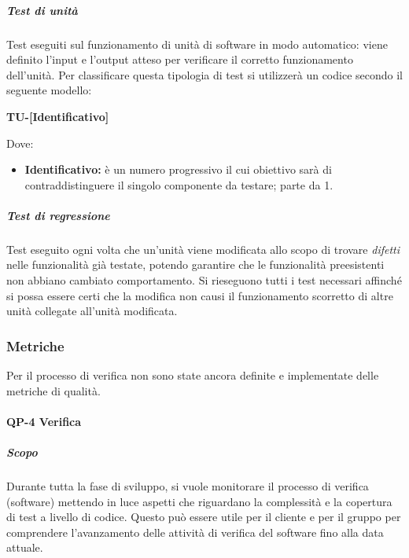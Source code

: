                     \subparagraph*{Test di unità}
                            Test eseguiti sul funzionamento di unità di software in modo automatico: viene definito l'input e l'output atteso per verificare il corretto funzionamento dell'unità.
                            Per classificare questa tipologia di test si utilizzerà un codice secondo il seguente modello:     

                            \begin{center}
                            	\textbf{TU-[Identificativo]}
                            \end{center}
                            Dove:
                            
							\begin{itemize}
                            	\item \textbf{Identificativo:} è un numero progressivo il cui obiettivo sarà di contraddistinguere il singolo componente da testare; parte da 1.
							\end{itemize}
						
                    \subparagraph*{Test di regressione}
        				Test eseguito ogni volta che un'unità viene modificata allo scopo di trovare \textit{difetti} nelle funzionalità già testate, potendo garantire che le funzionalità preesistenti non abbiano cambiato comportamento. Si rieseguono tutti i test necessari affinché si possa essere certi che la modifica non causi il funzionamento scorretto di altre unità collegate all'unità modificata.


                \subsubsection{Metriche}

                Per il processo di verifica non sono state ancora definite e implementate delle metriche di qualità.

                \paragraph{QP-4 Verifica}

                    \subparagraph{Scopo}

                        Durante tutta la fase di sviluppo, si vuole monitorare il processo di verifica (software) mettendo in luce aspetti che riguardano la complessità e la copertura di test a livello di codice. Questo può essere utile per il cliente e per il gruppo per comprendere l'avanzamento delle attività di verifica del software fino alla data attuale.

